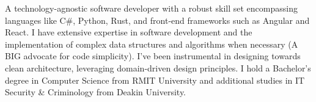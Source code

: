 
\par{
A technology-agnostic software developer with a robust skill set encompassing languages like C\#, Python, Rust, and front-end frameworks such as Angular and React. I have extensive expertise in software development and the implementation of complex data structures and algorithms when necessary (A BIG advocate for code simplicity). I've been instrumental in designing towards clean architecture, leveraging domain-driven design principles. I hold a Bachelor's degree in Computer Science from RMIT University and additional studies in IT Security \& Criminology from Deakin University.
}